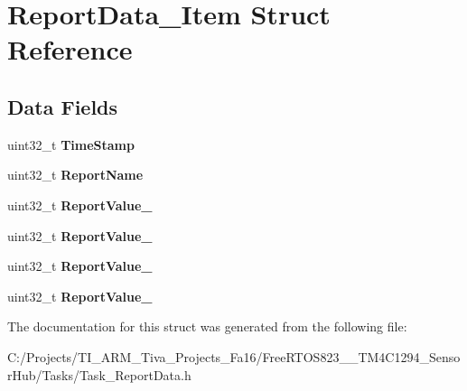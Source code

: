 \hypertarget{struct_report_data___item}{}\section{Report\+Data\+\_\+\+Item Struct Reference}
\label{struct_report_data___item}
\subsection*{Data Fields}
\begin{DoxyCompactItemize}
\item 
\hypertarget{struct_report_data___item_ae5496f262c20f5fff03194f25526ce90}{}uint32\+\_\+t {\bfseries Time\+Stamp}\label{struct_report_data___item_ae5496f262c20f5fff03194f25526ce90}

\item 
\hypertarget{struct_report_data___item_ab4e59bcda44a33171b297da17d238915}{}uint32\+\_\+t {\bfseries Report\+Name}\label{struct_report_data___item_ab4e59bcda44a33171b297da17d238915}

\item 
\hypertarget{struct_report_data___item_a69327a9db23d5874a10d522c48edfc5b}{}uint32\+\_\+t {\bfseries Report\+Value\+\_}\label{struct_report_data___item_a69327a9db23d5874a10d522c48edfc5b}

\item 
\hypertarget{struct_report_data___item_a1acb01b269a43a0a98848057e5f51e39}{}uint32\+\_\+t {\bfseries Report\+Value\+\_}\label{struct_report_data___item_a1acb01b269a43a0a98848057e5f51e39}

\item 
\hypertarget{struct_report_data___item_a356dd7e7ea368d67f791e886ef3c75f1}{}uint32\+\_\+t {\bfseries Report\+Value\+\_}\label{struct_report_data___item_a356dd7e7ea368d67f791e886ef3c75f1}

\item 
\hypertarget{struct_report_data___item_af8bbe61d1e014d38a97e206b540981c6}{}uint32\+\_\+t {\bfseries Report\+Value\+\_}\label{struct_report_data___item_af8bbe61d1e014d38a97e206b540981c6}

\end{DoxyCompactItemize}


The documentation for this struct was generated from the following file\+:\begin{DoxyCompactItemize}
\item 
C\+:/\+Projects/\+T\+I\+\_\+\+A\+R\+M\+\_\+\+Tiva\+\_\+\+Projects\+\_\+\+Fa16/\+Free\+R\+T\+O\+S823\+\_\+\_\+\+T\+M4\+C1294\+\_\+\+Sensor\+Hub/\+Tasks/Task\+\_\+\+Report\+Data.\+h\end{DoxyCompactItemize}
